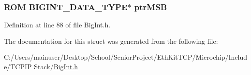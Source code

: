 \hypertarget{struct___b_i_g_i_n_t___r_o_m_a6daa582d26fde2f1ab0c854fee432324}{}
\subsubsection[{ptr\+M\+S\+B}]{\setlength{\rightskip}{0pt plus 5cm}R\+O\+M B\+I\+G\+I\+N\+T\+\_\+\+D\+A\+T\+A\+\_\+\+T\+Y\+P\+E$\ast$ ptr\+M\+S\+B}\label{struct___b_i_g_i_n_t___r_o_m_a6daa582d26fde2f1ab0c854fee432324}


Definition at line 88 of file Big\+Int.\+h.



The documentation for this struct was generated from the following file\+:\begin{DoxyCompactItemize}
\item 
C\+:/\+Users/mainuser/\+Desktop/\+School/\+Senior\+Project/\+Eth\+Kit\+T\+C\+P/\+Microchip/\+Include/\+T\+C\+P\+I\+P Stack/\hyperlink{_big_int_8h}{Big\+Int.\+h}\end{DoxyCompactItemize}
